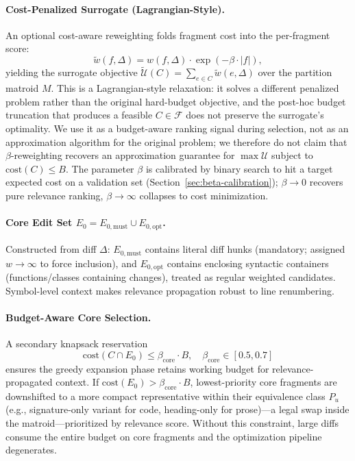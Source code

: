 \documentclass[11pt, a4paper]{article}
\begin{document}
\paragraph{Cost-Penalized Surrogate (Lagrangian-Style).} An optional cost-aware reweighting folds fragment cost into the per-fragment score:
\begin{equation}
\tilde{w}(f, \Delta) = w(f, \Delta) \cdot \exp(-\beta \cdot |f|),
\label{eq:boltzmann}
\end{equation}
yielding the surrogate objective $\tilde{\mathcal{U}}(C) = \sum_{e \in C} \tilde{w}(e, \Delta)$ over the partition matroid $M$. This is a Lagrangian-style relaxation: it solves a different penalized problem rather than the original hard-budget objective, and the post-hoc budget truncation that produces a feasible $C \in \mathcal{F}$ does not preserve the surrogate's optimality. We use it as a budget-aware ranking signal during selection, not as an approximation algorithm for the original problem; we therefore do not claim that $\beta$-reweighting recovers an approximation guarantee for $\max \mathcal{U}$ subject to $\mathrm{cost}(C) \leq B$. The parameter $\beta$ is calibrated by binary search to hit a target expected cost on a validation set (Section~\ref{sec:beta-calibration}); $\beta \to 0$ recovers pure relevance ranking, $\beta \to \infty$ collapses to cost minimization.

\paragraph{Core Edit Set $E_0 = E_{0,\mathrm{must}} \cup E_{0,\mathrm{opt}}$.} Constructed from diff $\Delta$: $E_{0,\mathrm{must}}$ contains literal diff hunks (mandatory; assigned $w \to \infty$ to force inclusion), and $E_{0,\mathrm{opt}}$ contains enclosing syntactic containers (functions/classes containing changes), treated as regular weighted candidates. Symbol-level context makes relevance propagation robust to line renumbering.

\paragraph{Budget-Aware Core Selection.} A secondary knapsack reservation
\begin{equation}
\mathrm{cost}(C \cap E_0) \leq \beta_{\mathrm{core}} \cdot B, \quad \beta_{\mathrm{core}} \in [0.5, 0.7]
\end{equation}
ensures the greedy expansion phase retains working budget for relevance-propagated context. If $\mathrm{cost}(E_0) > \beta_{\mathrm{core}} \cdot B$, lowest-priority core fragments are downshifted to a more compact representative within their equivalence class $P_u$ (e.g., signature-only variant for code, heading-only for prose)---a legal swap inside the matroid---prioritized by relevance score. Without this constraint, large diffs consume the entire budget on core fragments and the optimization pipeline degenerates.
\end{document}
